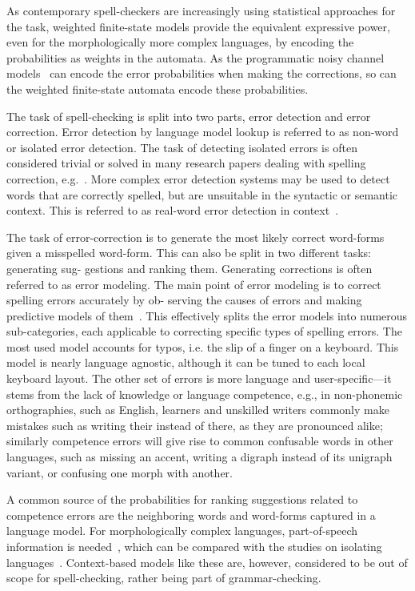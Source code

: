 \documentclass[postprint]{flammie}
\begin{document}
As contemporary spell-checkers are increasingly using statistical approaches
for the task, weighted finite-state models provide the equivalent expressive
power, even for the morphologically more complex languages, by encoding the
probabilities as weights in the automata. As the programmatic noisy channel
models~\cite{brill2000improved} can encode the error probabilities when making
the corrections, so can the weighted finite-state automata encode these
probabilities.

The task of spell-checking is split into two parts, error detection and error
correction. Error detection by language model lookup is referred to as
non-word or isolated error detection. The task of detecting isolated errors is
often considered trivial or solved in many research papers dealing with
spelling correction, e.g.~\cite{otero2007contextual}. More complex error
detection systems may be used to detect words that are correctly spelled, but
are unsuitable in the syntactic or semantic context. This is referred to as
real-word error detection in context~\cite{mays1991context}.

The task of error-correction is to generate the most likely correct word-forms
given a misspelled word-form. This can also be split in two different tasks:
generating sug- gestions and ranking them. Generating corrections is often
referred to as error modeling. The main point of error modeling is to correct
spelling errors accurately by ob- serving the causes of errors and making
predictive models of them~\cite{deorowicz2005correcting}. This effectively
splits the error models into numerous sub-categories, each applicable to
correcting specific types of spelling errors. The most used model accounts for
typos, i.e. the slip of a finger on a keyboard. This model is nearly language
agnostic, although it can be tuned to each local keyboard layout. The other set
of errors is more language and user-specific—it stems from the lack of
knowledge or language competence, e.g., in non-phonemic orthographies, such as
English, learners and unskilled writers commonly make mistakes such as
writing their instead of there, as they are pronounced alike; similarly
competence errors will give rise to common confusable words in other languages,
such as missing an accent, writing a digraph instead of its unigraph variant,
or confusing one morph with another.

A common source of the probabilities for ranking suggestions related to
competence errors are the neighboring words and word-forms captured in a
language model.  For morphologically complex languages, part-of-speech
information is needed~\cite{otero2007contextual,pirinen2012improving}, which
can be compared with the studies on isolating
languages~\cite{mays1991context,wilcoxohearn2008realword}. Context-based models
like these are, however, considered to be out of scope for spell-checking,
rather being part of grammar-checking.
\end{document}
